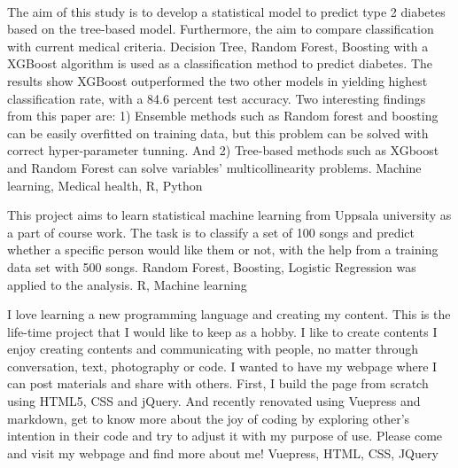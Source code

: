 %
%
%



\begin{projects}
{ \\ The aim of this study is to develop a statistical model to predict type 2 diabetes based on the tree-based model. Furthermore, the aim to compare classification with current medical criteria. Decision Tree, Random Forest, Boosting with a XGBoost algorithm is used as a classification method to predict diabetes. The results show XGBoost outperformed the two other models in yielding highest classification rate, with a 84.6 percent test accuracy. Two interesting findings from this paper are: 1) Ensemble methods such as Random forest and boosting can be easily overfitted on training data, but this problem can be solved with correct hyper-parameter tunning. And 2) Tree-based methods such as XGboost and Random Forest can solve variables' multicollinearity problems.}
{Machine learning, Medical health, R, Python}

\end{projects}


\begin{projects}
{  }
{This project aims to learn statistical machine learning from Uppsala university as a part of course work. The task is to classify a set of 100 songs and predict whether a specific person would like them or not, with the help from a training data set with 500 songs. Random Forest, Boosting, Logistic Regression was applied to the analysis.}
{R, Machine learning}

\end{projects}

\begin{projects}
{  }
{I love learning a new programming language and creating my content. 
This is the life-time project that I would like to keep as a hobby. I like to create contents I enjoy creating contents and communicating with people, no matter through conversation, text, photography or code. I wanted to have my webpage where I can post materials and share with others. First, I build the page from scratch using HTML5, CSS and jQuery. And recently renovated using Vuepress and markdown,  get to know more about the joy of coding by exploring other's intention in their code and try to adjust it with my purpose of use. Please come and visit my webpage and find more about me!}
{Vuepress, HTML, CSS, JQuery}   
\end{projects}

